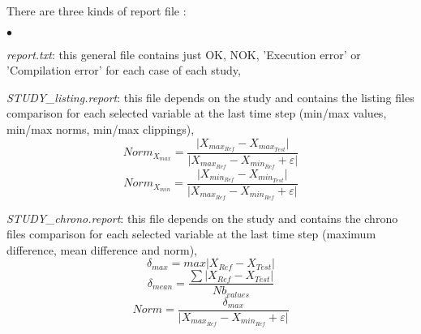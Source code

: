 There are three kinds of report file :
\begin{list}{$\bullet$}{}
\item {\it report.txt}: this general file contains just OK, NOK,
      'Execution error' or 'Compilation error' for each case of
      each study,
\item {\it STUDY\_listing.report}: this file depends on the study
      and contains the listing files comparison for each selected
      variable at the last time step (min/max values, min/max norms,
      min/max clippings),
      $$Norm_{X_{max}}=\frac{\vert{X_{max_{Ref}}-X_{max_{Test}}}\vert}{\vert{X_{max_{Ref}}-X_{min_{Ref}}}+\varepsilon\vert}$$
      $$Norm_{X_{min}}=\frac{\vert{X_{min_{Ref}}-X_{min_{Test}}}\vert}{\vert{X_{max_{Ref}}-X_{min_{Ref}}}+\varepsilon\vert}$$
\item {\it STUDY\_chrono.report}: this file depends on the study
      and contains the chrono files comparison for each selected
      variable at the last time step (maximum difference, mean
      difference and norm),
      $$\delta_{max}= max \vert{X_{Ref}-X_{Test}\vert}$$
      $$\delta_{mean}= \frac{\sum \vert{X_{Ref}-X_{Test}}\vert}{Nb_{values}} $$
      $$Norm = \frac{\delta_{max}}{\vert{X_{max_{Ref}}-X_{min_{Ref}}}+\varepsilon\vert}$$

\end{list}
